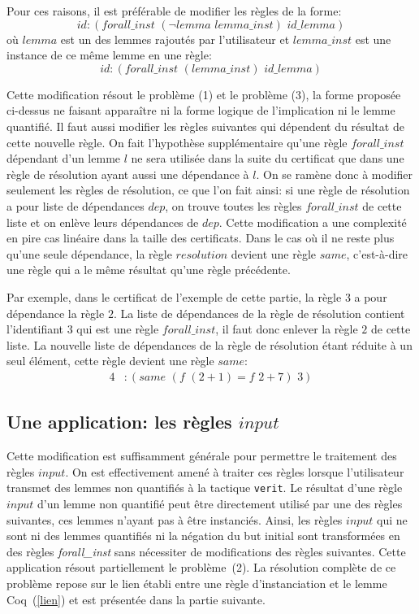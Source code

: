 \documentclass[11pt]{article}
\begin{document}
Pour ces raisons, il est préférable de modifier les règles de la forme:
\[id:(forall\_inst \,\,(\neg lemma \,\, lemma\_inst) \,\,id\_lemma)\]
où $lemma$ est un des lemmes rajoutés par l'utilisateur et $lemma\_inst$ est une instance de ce même lemme en une règle:
\[id:(forall\_inst \,\,(lemma\_inst) \,\, id\_lemma)\]

Cette modification résout le problème (1) et le problème (3), la forme proposée ci-dessus ne faisant apparaître ni la forme logique de l'implication ni le lemme quantifié. Il faut aussi modifier les règles suivantes qui dépendent du résultat de cette nouvelle règle. On fait l'hypothèse supplémentaire qu'une règle $forall\_inst$ dépendant d'un lemme $l$ ne sera utilisée dans la suite du certificat que dans une règle de résolution ayant aussi une dépendance à $l$. On se ramène donc à modifier seulement les règles de résolution, ce que l'on fait ainsi: si une règle de résolution a pour liste de dépendances $dep$, on trouve toutes les règles $forall\_inst$ de cette liste et on enlève leurs dépendances de $dep$. Cette modification a une complexité en pire cas linéaire dans la taille des certificats. Dans le cas où il ne reste plus qu'une seule dépendance, la règle $resolution$ devient une règle $same$, c'est-à-dire une règle qui a le même résultat qu'une règle précédente. \medbreak

Par exemple, dans le certificat de l'exemple de cette partie, la règle $3$ a pour dépendance la règle $2$. La liste de dépendances de la règle de résolution contient l'identifiant $3$ qui est une règle $forall\_inst$, il faut donc enlever la règle $2$ de cette liste. La nouvelle liste de dépendances de la règle de résolution étant réduite à un seul élément, cette règle devient une règle $same$:
\begin{align*}
4&:(same  \,\, (f \,\,(2+1) = f\,\,2+7) \,\,3) 
\end{align*}

\subsection{Une application: les règles $input$}

Cette modification est suffisamment générale pour permettre le traitement des règles $input$. On est effectivement amené à traiter ces règles lorsque l'utilisateur transmet des lemmes non quantifiés à la tactique \texttt{verit}. Le résultat d'une règle $input$ d'un lemme non quantifié peut être directement utilisé par une des règles suivantes, ces lemmes n'ayant pas à être instanciés. Ainsi, les règles $input$ qui ne sont ni des lemmes quantifiés ni la négation du but initial sont transformées en des règles \textit{forall\_inst} sans nécessiter de modifications des règles suivantes. Cette application résout partiellement le problème~(2). La résolution complète de ce problème repose sur le lien établi entre une règle d'instanciation et le lemme Coq~(\ref{lien}) et est présentée dans la partie suivante.
\end{document}
